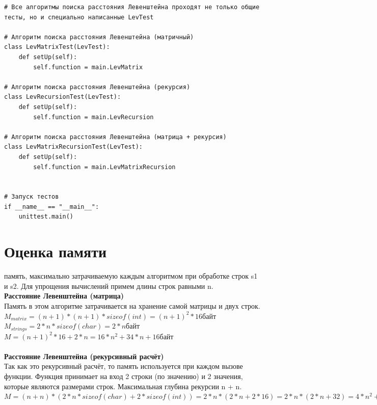 \documentclass[12pt]{report}
\begin{document}
\begin{lstlisting}[label=some-code, caption = Тесты]
# Все алгоритмы поиска расстояния Левенштейна проходят не только общие тесты, но и специально написанные LevTest
	
# Алгоритм поиска расстояния Левенштейна (матричный)
class LevMatrixTest(LevTest):
	def setUp(self):
		self.function = main.LevMatrix
	
# Алгоритм поиска расстояния Левенштейна (рекурсия)
class LevRecursionTest(LevTest):
	def setUp(self):
		self.function = main.LevRecursion

# Алгоритм поиска расстояния Левенштейна (матрица + рекурсия)
class LevMatrixRecursionTest(LevTest):
	def setUp(self):
		self.function = main.LevMatrixRecursion
	
	
# Запуск тестов
if __name__ == "__main__":
	unittest.main()
\end{lstlisting}

\section{Оценка памяти}
 память, максимально затрачиваемую каждым алгоритмом при обработке строк s1 и s2. Для упрощения вычислений примем длины строк равными n.\\

\textbf{Расстояние Левенштейна (матрица)}\\

Память в этом алгоритме затрачивается на хранение самой матрицы и двух строк.\\

$M_{matrix} = (n + 1)*(n + 1)*sizeof(int) = (n + 1)^2 * 16 байт$\\

$M_{strings} = 2*n*sizeof(char) = 2*n байт$\\

$M = (n + 1)^2 * 16 + 2*n = 16 * n^2 + 34 * n + 16 байт$\\
\\

\textbf{Расстояние Левенштейна (рекурсивный расчёт)}\\

Так как это рекурсивный расчёт, то память используется при каждом вызове функции. Функция принимает на вход 2 строки (по значению) и 2 значения, которые являются размерами строк. Максимальная глубина рекурсии n + n. \\

$M = (n + n) * (2 * n * sizeof(char) + 2 * sizeof(int)) = 2 * n * (2 * n + 2 * 16) = 2 * n * (2 * n + 32) = 4 * n^2 + 64 * n байт$\\
\\
\end{document}
